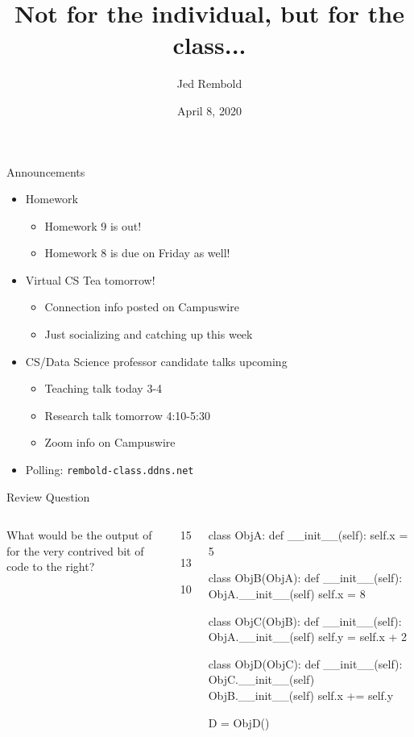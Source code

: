\documentclass[pdf, aspectratio=169, 12pt]{beamer}
\title{Not for the individual, but for the class...}
\author{Jed Rembold}
\date{April 8, 2020}
\begin{document}
\begin{frame}{Announcements}
	\begin{itemize}
		\item Homework
			\begin{itemize}
				\item Homework 9 is out!
				\item Homework 8 is due on Friday as well!
			\end{itemize}
		\item Virtual CS Tea tomorrow!
			\begin{itemize}
				\item Connection info posted on Campuswire
				\item Just socializing and catching up this week
			\end{itemize}
		\item CS/Data Science professor candidate talks upcoming
			\begin{itemize}
				\item Teaching talk today 3-4
				\item Research talk tomorrow 4:10-5:30
				\item Zoom info on Campuswire
			\end{itemize}
			
		\item Polling: \nolinkurl{rembold-class.ddns.net}
	\end{itemize}
\end{frame}

\begin{frame}[fragile]{Review Question}
	\begin{columns}
		What would be the output of  for the very contrived bit of code to the right?
		\begin{poll}
		\item 15
		\item 13
		\item 10
		\item {}
		\end{poll}
		
		\scriptsize
		\vspace{-8mm}
		\begin{pythoncode}
			class ObjA:
				def __init__(self):
					self.x = 5

			class ObjB(ObjA):
				def __init__(self):
					ObjA.__init__(self)
					self.x = 8

			class ObjC(ObjB):
				def __init__(self):
					ObjA.__init__(self)
					self.y = self.x + 2

			class ObjD(ObjC):
				def __init__(self):
					ObjC.__init__(self)
					ObjB.__init__(self)
					self.x += self.y

			D = ObjD()
		\end{pythoncode}
	\end{columns}
\end{frame}
\end{document}
